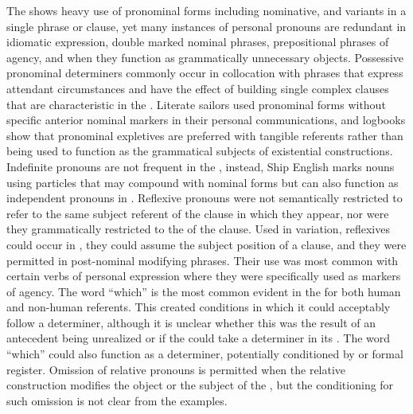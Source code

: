 The  shows heavy use of pronominal forms including nominative,  and  variants in a single phrase or clause, yet many instances of personal pronouns are redundant in idiomatic expression, double marked nominal phrases, prepositional phrases of agency, and when they function as grammatically unnecessary  objects. Possessive pronominal determiners commonly occur in collocation with  phrases that express attendant circumstances and have the effect of building single complex clauses that are characteristic in the . Literate sailors used  pronominal forms without specific anterior nominal markers in their personal communications, and logbooks show that pronominal expletives are preferred with tangible referents rather than being used to function as the grammatical subjects of existential constructions. Indefinite pronouns are not frequent in the , instead, Ship English marks  nouns using  particles that may compound with nominal forms but can also function as independent pronouns in . Reflexive pronouns were not semantically restricted to refer to the same subject referent of the clause in which they appear, nor were they grammatically restricted to the  of the clause. Used in variation, reflexives could occur in , they could assume the subject position of a clause, and they were permitted in post-nominal modifying phrases. Their use was most common with certain verbs of personal expression where they were specifically used as markers of  agency. The word “which” is the most common  evident in the  for both human and non-human referents. This  created conditions in which it could acceptably follow a determiner, although it is unclear whether this was the result of an antecedent  being unrealized or if the  could take a determiner in its . The word “which” could also function as a  determiner, potentially conditioned by  or formal register. Omission of relative pronouns is permitted when the relative construction modifies the object or the subject of the , but the conditioning for such omission is not clear from the  examples. 

